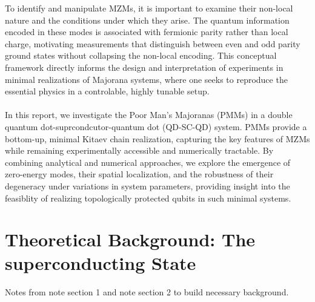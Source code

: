 \documentclass[11pt, letterpaper, titlepage]{article}
\begin{document}
To identify and manipulate MZMs, it is important to examine their non-local nature and the conditions under which they arise. The quantum information encoded in these modes is associated with fermionic parity rather than local charge, motivating measurements that distinguish between even and odd parity ground states without collapsing the non-local encoding. This conceptual framework directly informs the design and interpretation of experiments in minimal realizations of Majorana systems, where one seeks to reproduce the essential physics in a controlable, highly tunable setup. \\ \\
In this report, we investigate the Poor Man's Majoranas (PMMs) in a double quantum dot-suprcondcutor-quantum dot (QD-SC-QD) system. PMMs provide a bottom-up, minimal Kitaev chain realization, capturing the key features of MZMs while remaining experimentally accessible and numerically tractable. By combining analytical and numerical approaches, we explore the emergence of zero-energy modes, their spatial localization, and the robustness of their degeneracy under variations in system parameters, providing insight into the feasiblity of realizing topologically protected qubits in such minimal systems.\\

\section{Theoretical Background: The superconducting State}
Notes from note section 1 and note section 2 to build necessary background.\par
\end{document}
